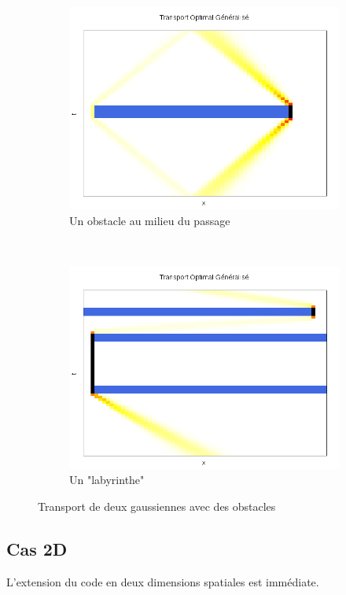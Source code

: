 \documentclass[a4paper,12pt]{article}
\begin{document}
\begin{figure}[!h]
	\begin{subfigure}[b]{0.48\linewidth}
	\includegraphics[width=\textwidth]{img/1DObstacle/resultat.png}
	\caption{Un obstacle au milieu du passage}
	\end{subfigure}
	~
	\begin{subfigure}[b]{0.48\linewidth}
	\includegraphics[width=\textwidth]{img/1DLabyrinthe/resultat.png}
	\caption{Un "labyrinthe"}
	\end{subfigure}	
	\caption{Transport de deux gaussiennes avec des obstacles}
\end{figure}

\newpage




\newpage
\subsection{Cas 2D}
L'extension du code en deux dimensions spatiales est immédiate. 
\end{document}

